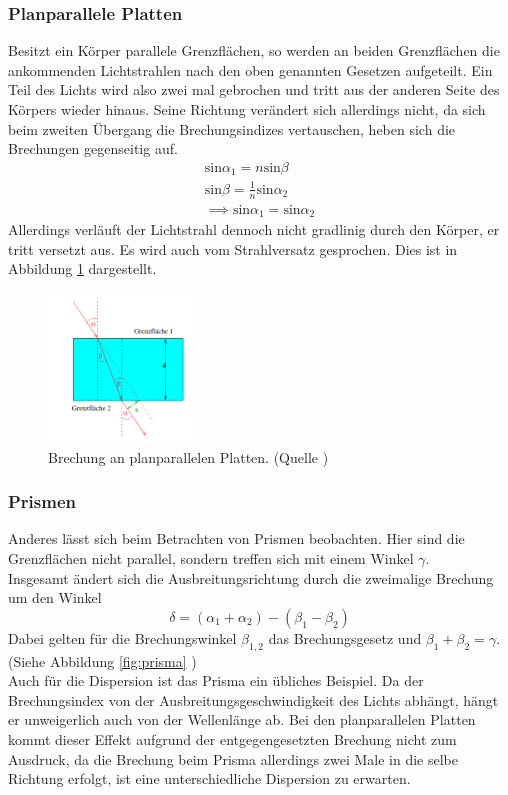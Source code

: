 \subsubsection{Planparallele Platten}
Besitzt ein Körper parallele Grenzflächen, so werden an beiden Grenzflächen
die ankommenden Lichtstrahlen nach den oben genannten Gesetzen aufgeteilt.
Ein Teil des Lichts wird also zwei mal gebrochen und tritt aus der anderen Seite
des Körpers wieder hinaus. Seine Richtung verändert sich allerdings nicht,
da sich beim zweiten Übergang die Brechungsindizes vertauschen, heben sich die
Brechungen gegenseitig auf.
\begin{align*}
    \text{sin}\alpha_1 = n \text{sin}\beta \\
    \text{sin}\beta = \frac{1}{n} \text{sin}\alpha_2\\
    \implies \text{sin}\alpha_1 = \text{sin}\alpha_2
\end{align*}
Allerdings verläuft der Lichtstrahl dennoch nicht gradlinig durch den Körper,
er tritt versetzt aus. Es wird auch vom Strahlversatz gesprochen. Dies ist 
in Abbildung \ref{fig:platten} dargestellt.

\begin{figure}
    \centering
    \includegraphics[width=0.35\textwidth]{parallel.png}
    \caption{Brechung an planparallelen Platten. (Quelle \cite{versuch})}
    \label{fig:platten}
\end{figure}

\subsubsection{Prismen}
Anderes lässt sich beim Betrachten von Prismen beobachten. Hier sind die 
Grenzflächen nicht parallel, sondern treffen sich mit einem Winkel $\gamma$.\\
Insgesamt ändert sich die Ausbreitungsrichtung
durch die zweimalige Brechung um den Winkel
\begin{equation}
    \delta = \left( \alpha_1 + \alpha_2 \right) - \left( \beta_1 - \beta_2 \right)
    \label{eqn:prisma}
\end{equation}
Dabei gelten für die Brechungswinkel $\beta_{1, 2}$ das Brechungsgesetz und $\beta_1 + \beta_2 = \gamma$.
(Siehe Abbildung \ref{fig:prisma} )\\
Auch für die Dispersion ist das Prisma ein übliches Beispiel. Da der Brechungsindex
von der Ausbreitungsgeschwindigkeit des Lichts abhängt, hängt er unweigerlich auch
von der Wellenlänge ab. Bei den planparallelen Platten kommt dieser Effekt 
aufgrund der entgegengesetzten Brechung nicht zum Ausdruck, 
da die Brechung beim Prisma allerdings zwei Male in die selbe Richtung 
erfolgt, ist eine unterschiedliche Dispersion zu erwarten.


